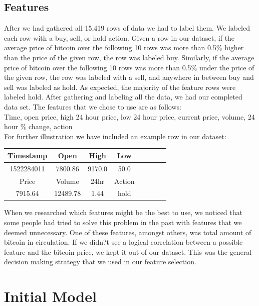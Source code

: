 \documentclass{article}
\begin{document}
\subsection{ Features }
After we had gathered all 15,419 rows of data we had to label them. We labeled each row with a buy, sell, or hold action. Given a row in our dataset, if the average price of bitcoin over the following 10 rows was more than 0.5\% higher than the price of the given row, the row was labeled buy. Similarly, if the average price of bitcoin over the following 10 rows was more than 0.5\% under the price of the given row, the row was labeled with a sell, and anywhere in between buy and sell was labeled as hold. As expected, the majority of the feature rows were labeled hold. After gathering and labeling all the data, we had our completed data set. The features that we chose to use are as follows: \\
Time, open price, high 24 hour price, low 24 hour price, current price, volume, 24 hour \% change, action \\
For further illustration we have included an example row in our dataset: \\


\begin{center}
  \begin{tabular}{| c | c | c | c | c | c | c | r | }
    \hline
    Timestamp & Open & High & Low \\ \hline
    1522284011 & 7800.86 & 9170.0 & 50.0 \\ \hline
    \hline
    Price & Volume & 24hr & Action  \\ \hline
    7915.64 & 12489.78 & 1.44 & hold   \\ \hline
      \end{tabular}
\end{center}


When we researched which features might be the best to use, we noticed that some people had tried to solve this problem in the past with features that we deemed unnecessary. One of these features, amongst others, was total amount of bitcoin in circulation. If we didn?t see a logical correlation between a possible feature and the bitcoin price, we kept it out of our dataset. This was the general decision making strategy that we used in our feature selection. 


\section{ Initial Model }
\end{document}
